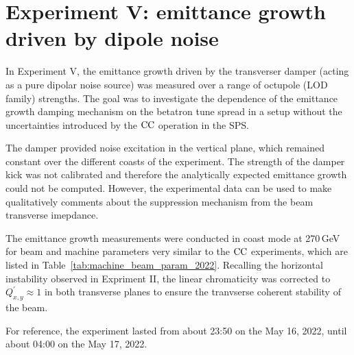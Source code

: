 \section{Experiment V: emittance growth driven by dipole noise}\label{sec:exp5_coast_md_damper_2022}

In Experiment V, the emittance growth driven by the transverser damper (acting as a pure dipolar noise source) was measured over a range of octupole (LOD family) strengths. The goal was to investigate the dependence of the emittance growth damping mechanism on the betatron tune spread in a setup without the uncertainties introduced by the ${\mathrm{CC}}$ operation in the SPS. %


The damper provided noise excitation in the vertical plane, which remained constant over the different coasts of the experiment. The strength of the damper kick was not calibrated and therefore the analytically expected emittance growth could not be computed. However, the experimental data can be used to make qualitatively comments about the suppression mechanism from the beam transverse imepdance.  

The emittance growth measurements were conducted in coast mode at 270\,GeV for beam and machine parameters very similar to the ${\mathrm{CC}}$ experiments, which are listed in Table~\ref{tab:machine_beam_param_2022}. Recalling the horizontal instability observed in Expriment II, the linear chromaticity was corrected to $Q^\prime_{x,y} \approx 1$ in both transverse planes to ensure the tranvserse coherent stability of the beam.


For reference, the experiment lasted from about 23:50 on the May 16, 2022, until about 04:00 on the May 17, 2022.

